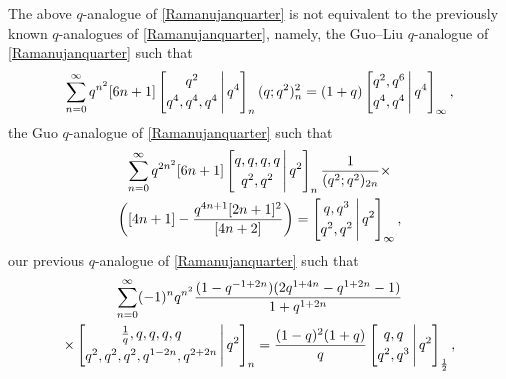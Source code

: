 \documentclass[12pt]{article}
\begin{document}
 The above $q$-analogue of \eqref{Ramanujanquarter} is not equivalent to 
 the previously known $q$-analogues of \eqref{Ramanujanquarter}, 
 namely, the Guo--Liu $q$-analogue of \eqref{Ramanujanquarter} \cite{GuoLiu2018} such that 
$$ \sum_{n=0}^{\infty} 
 q^{n^2} [6n+1] \left[ \begin{matrix} 
 q^2 \vspace{1mm} \\ 
 q^4, q^4, q^4 \end{matrix} \, \Bigg| \, q^{4} \right]_{n} (q;q^2)_{n}^{2} 
 = (1+q) 
 \left[ \begin{matrix} 
 q^{2}, q^{6} \vspace{1mm} \\ 
 q^4, q^4 \end{matrix} \, \Bigg| \, q^{4} \right]_{\infty}, $$
 the Guo $q$-analogue of \eqref{Ramanujanquarter} \cite{Guo2020} such that 
\begin{multline*}
 \sum_{n=0}^{\infty} 
 q^{2n^2} [6n+1] \left[ \begin{matrix} 
 q, q, q, q \vspace{1mm} \\ 
 q^2, q^2 \end{matrix} \, \Bigg| \, q^{2} \right]_{n} \frac{1}{(q^2;q^2)_{2n}} \times \\ 
 \left( [4n+1] - \frac{q^{4n+1}[2n+1]^2}{[4n+2]} \right) = 
 \left[ \begin{matrix} 
 q, q^{3} \vspace{1mm} \\ 
 q^2, q^2 \end{matrix} \, \Bigg| \, q^{2} \right]_{\infty}, 
\end{multline*}
 our previous $q$-analogue of \eqref{Ramanujanquarter} \cite{Campbell2026} such that 
\begin{multline*}
 \sum_{n=0}^{\infty} (-1)^n 
 q^{n^2} \frac{ (1-q^{ -1 + 2n}) (2 q^{1+4n} - q^{1+2n} - 1 ) }{1 + q^{1+2n}} \\ 
 \times \left[ \begin{matrix} \frac{1}{q}, q, q, q, q \vspace{1mm} \\ 
 q^2, q^2, q^2, q^{1-2n}, q^{2+2n} \end{matrix} \, \Bigg| \, q^2 \right]_{n}
 = 
 \frac{(1-q)^2 (1+q)}{q} \left[ \begin{matrix} q, q \vspace{1mm} \\ 
 q^2, q^3 \end{matrix} \, \Bigg| \, q^2 \right]_{\frac{1}{2}}, 
\end{multline*}
\end{document}
